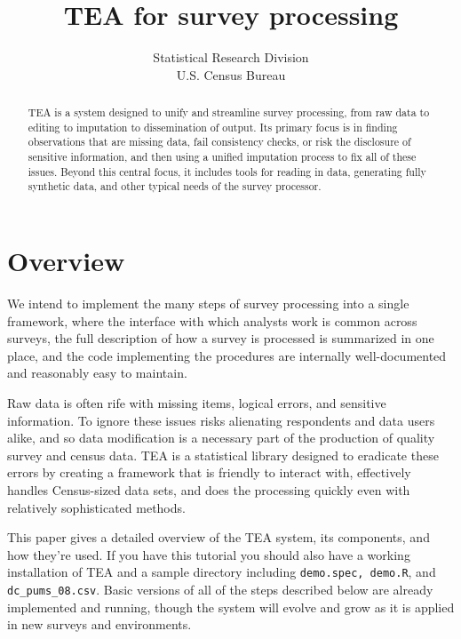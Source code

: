 \documentclass{article}
\begin{document}
\author{Statistical Research Division\\U.S. Census Bureau}
\title{TEA for survey processing}
\maketitle

\begin{abstract}
TEA is a system designed to unify and streamline survey processing, from raw data to
editing to imputation to dissemination of output. Its primary focus is in finding 
observations that are missing data, fail consistency checks, or risk the disclosure of
sensitive information, and then using a unified imputation process to fix all of these
issues. Beyond this central focus, it includes tools for reading in data, generating
fully synthetic data, and other typical needs of the survey processor.
\end{abstract}


\section{Overview}
{\sc We intend} to implement the many steps of survey processing into a single
framework, where the interface with which analysts work is common across surveys,
the full description of how a survey is processed is summarized in one place, and the
code implementing the procedures are internally well-documented and reasonably easy
to maintain.

Raw data is often rife with missing items, logical errors, and sensitive information. 
To ignore these issues risks alienating respondents and data users alike, and so data 
modification is a necessary part of the production of quality survey and census data. 
TEA is a statistical library designed to eradicate these errors by creating a framework 
that is friendly to interact with, effectively handles Census-sized data sets, and does 
the processing quickly even with relatively sophisticated methods.

This paper gives a detailed overview of the TEA system, its components, and how they're 
used. If you have this tutorial you should also have a working installation of TEA and 
a sample directory including {\tt demo.spec, demo.R}, and {\tt dc\_pums\_08.csv}. 
Basic versions of all of the steps described below are already implemented and running,
though the system will evolve and grow as it is applied in new surveys and environments.
\end{document}
